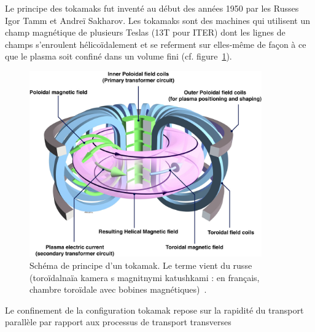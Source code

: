 Le principe des tokamaks fut inventé au début des années 1950 par les Russes Igor Tamm et
Andreï Sakharov. Les tokamaks sont des machines qui utilisent
un champ magnétique de plusieurs Teslas (13T pour ITER) dont les lignes de
champs s'enroulent hélicoïdalement et se referment sur elles-même de façon à ce que le plasma soit
confiné dans un volume fini (cf. figure~\ref{tokamak}).
\begin{figure}[!htbp]
    \centering
	\includegraphics[height=80mm]{figures/1-tokamak.jpg}
	\caption{Schéma de principe d'un tokamak. Le terme vient du
russe (toroïdalnaïa kamera s magnitnymi katushkami : en français, chambre toroïdale avec bobines
magnétiques)~\parencite{efda}.}\label{tokamak}
\end{figure}

Le confinement de la configuration tokamak repose sur la rapidité du transport
parallèle par rapport aux processus de transport transverses
